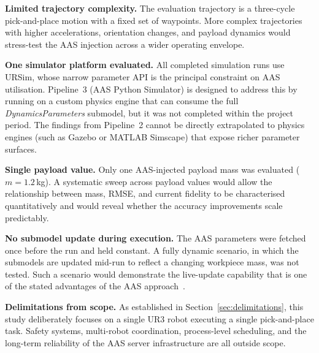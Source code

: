 \textbf{Limited trajectory complexity.}
The evaluation trajectory is a three-cycle pick-and-place motion with a fixed set of waypoints.
More complex trajectories with higher accelerations, orientation changes, and payload dynamics
would stress-test the AAS injection across a wider operating envelope.

\textbf{One simulator platform evaluated.}
All completed simulation runs use URSim, whose narrow parameter API is the principal constraint
on AAS utilisation.
Pipeline~3 (AAS Python Simulator) is designed to address this by running on a custom physics
engine that can consume the full \textit{DynamicsParameters} submodel, but it was not completed
within the project period.
The findings from Pipeline~2 cannot be directly extrapolated to physics engines (such as Gazebo
or MATLAB Simscape) that expose richer parameter surfaces.

\textbf{Single payload value.}
Only one AAS-injected payload mass was evaluated ($m = 1.2$\,kg).
A systematic sweep across payload values would allow the relationship between mass, RMSE, and
current fidelity to be characterised quantitatively and would reveal whether the accuracy
improvements scale predictably.

\textbf{No submodel update during execution.}
The AAS parameters were fetched once before the run and held constant.
A fully dynamic scenario, in which the submodels are updated mid-run to reflect a changing
workpiece mass, was not tested.
Such a scenario would demonstrate the live-update capability that is one of the stated
advantages of the AAS approach~\cite{IDTA_AAS_Part1}.

\textbf{Delimitations from scope.}
As established in Section~\ref{sec:delimitations}, this study deliberately focuses on a single
UR3 robot executing a single pick-and-place task.
Safety systems, multi-robot coordination, process-level scheduling, and the long-term reliability
of the AAS server infrastructure are all outside scope.
